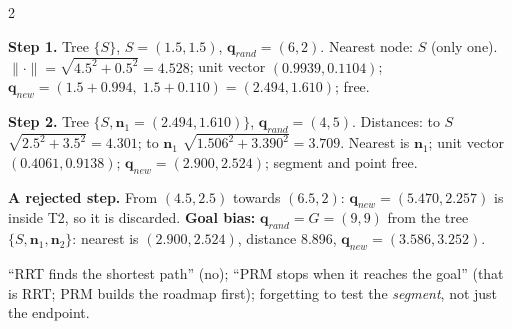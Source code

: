 \begin{multicols}{2}
\begin{worked}[SOLVED SAMPLE 6b: RRT steps on the practical map, $\delta=1$]
\textbf{Step 1.} Tree $\{S\}$, $S=(1.5,1.5)$, $\mathbf q_{rand}=(6,2)$. Nearest node: $S$ (only one). $\lVert\cdot\rVert=\sqrt{4.5^2+0.5^2}=4.528$; unit vector $(0.9939,0.1104)$; $\mathbf q_{new}=(1.5+0.994,\;1.5+0.110)=(\mathbf{2.494},\mathbf{1.610})$; free. \chk\par
\textbf{Step 2.} Tree $\{S,\mathbf n_1=(2.494,1.610)\}$, $\mathbf q_{rand}=(4,5)$. Distances: to $S$ $\sqrt{2.5^2+3.5^2}=4.301$; to $\mathbf n_1$ $\sqrt{1.506^2+3.390^2}=3.709$. Nearest is $\mathbf n_1$; unit vector $(0.4061,0.9138)$; $\mathbf q_{new}=(\mathbf{2.900},\mathbf{2.524})$; segment and point free. \chk\par
\textbf{A rejected step.} From $(4.5,2.5)$ towards $(6.5,2)$: $\mathbf q_{new}=(5.470,2.257)$ is inside T2, so it is discarded. \textbf{Goal bias:} $\mathbf q_{rand}=G=(9,9)$ from the tree $\{S,\mathbf n_1,\mathbf n_2\}$: nearest is $(2.900,2.524)$, distance 8.896, $\mathbf q_{new}=(3.586,3.252)$. \chk
\end{worked}
\begin{trap}
``RRT finds the shortest path'' (no); ``PRM stops when it reaches the goal'' (that is RRT; PRM builds the roadmap first); forgetting to test the \emph{segment}, not just the endpoint.
\end{trap}


\end{multicols}

